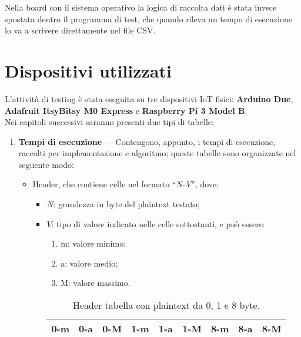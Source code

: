 \noindent Nella board con il sistema operativo la logica di raccolta dati è stata invece spostata dentro il programma di test, che quando rileva un tempo di esecuzione lo va a scrivere direttamente nel file CSV.

\newpage

\section{Dispositivi utilizzati}

L'attività di testing è stata eseguita su tre dispositivi IoT fisici: \textbf{Arduino Due}, \textbf{Adafruit ItsyBitsy M0 Express} e \textbf{Raspberry Pi 3 Model B}. \\

\noindent Nei capitoli successivi saranno presenti due tipi di tabelle:
\begin{enumerate}[label=\Roman*.]
    \item \textbf{Tempi di esecuzione} --- Contengono, appunto, i tempi di esecuzione, raccolti per implementazione e algoritmo; queste tabelle sono organizzate nel seguente modo:
    \begin{itemize}
        \item Header, che contiene celle nel formato ``\textit{N-V}'', dove:
        \begin{itemize}
            \item $N$: grandezza in byte del plaintext testato;
            \item $V$: tipo di valore indicato nelle celle sottostanti, e può essere:
            \begin{enumerate}[label=(\arabic*)]
                \item m: valore minimo;
                \item a: valore medio;
                \item M: valore massimo.
            \end{enumerate}
            \begin{table}[H]
                \centering
            	\begin{tabular}{|c|c|c|c|c|c|c|c|c|}
            		\hline
            		0-m & 0-a & 0-M & 1-m & 1-a & 1-M & 8-m & 8-a & 8-M \\
            		\hline
                \end{tabular}
                \caption{Header tabella con plaintext da 0, 1 e 8 byte.}
            \end{table}
        \end{itemize}

\end{itemize}
\end{enumerate}
